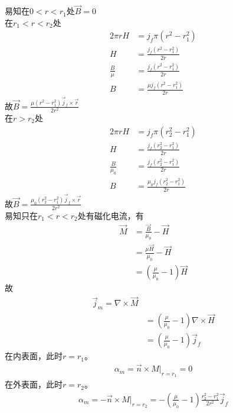 \documentclass{phyasgn}
\begin{document}
\begin{sol}[2]
    易知在$0<r<r_1$处$\vec{B}=0$\\
    在$r_1<r<r_2$处
    \begin{align*}
      2\pi rH&=j_f\pi(r^2-r_1^2)\\
      H&=\frac{j_f(r^2-r_1^2)}{2r}\\
      \frac{B}{\mu}&=\frac{j_f(r^2-r_1^2)}{2r}\\
      B&=\frac{\mu j_f(r^2-r_1^2)}{2r}
    \end{align*}
    故$\vec{B}=\frac{\mu (r^2-r_1^2)\vec{j}_f\times\vec{r}}{2r^2}$\\
    在$r>r_2$处
    \begin{align*}
        2\pi rH&=j_f\pi(r_2^2-r_1^2)\\
        H&=\frac{j_f(r_2^2-r_1^2)}{2r}\\
        \frac{B}{\mu_0}&=\frac{j_f(r_2^2-r_1^2)}{2r}\\
        B&=\frac{\mu_0 j_f(r_2^2-r_1^2)}{2r}
      \end{align*}
      故$\vec{B}=\frac{\mu_0 (r_2^2-r_1^2)\vec{j}_f\times\vec{r}}{2r^2}$\\
    易知只在$r_1<r<r_2$处有磁化电流，有
    \begin{align*}
      \vec{M}&=\frac{\vec{B}}{\mu_0}-\vec{H}\\
      &=\frac{\mu\vec{H}}{\mu_0}-\vec{H}\\
      &=(\frac{\mu}{\mu_0}-1)\vec{H}
    \end{align*}
    故
    \begin{align*}
      \vec{j}_m=\nabla\times\vec{M}\\
      &=(\frac{\mu}{\mu_0}-1)\nabla\times\vec{H}\\
      &=(\frac{\mu}{\mu_0}-1)\vec{j}_f
    \end{align*}
    在内表面，此时$r=r_1$。
    \begin{align*}
      \alpha_m=\vec{n}\times M|_{r=r_1}=0
    \end{align*}
    在外表面，此时$r=r_2$。
    \begin{align*}
        \alpha_m=-\vec{n}\times M|_{r=r_2}=-(\frac{\mu}{\mu_0}-1)\frac{r_2^2-r_1^2}{2r^2}\vec{j}_f
    \end{align*}
\end{sol}\par
\end{document}
